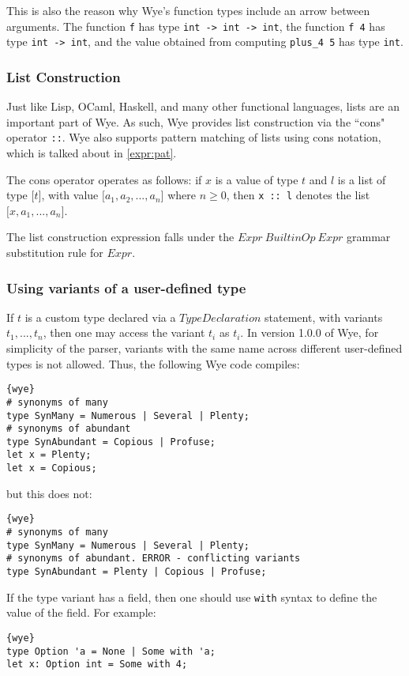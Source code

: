 \documentclass[a4paper, 12pt]{article}
\theoremstyle{myplain}
\theoremstyle{mydefinition}
\theoremstyle{myremark}
\numberwithin{equation} {section}
\numberwithin{figure}   {section}
\numberwithin{table}    {section}
\newcommand{\version}{1.0.0}
\begin{document}
This is also the reason why Wye's function types include an arrow between arguments. The function \texttt{f} has type \texttt{int -> int -> int}, the function \texttt{f 4} has type \texttt{int -> int}, and the value obtained from computing \texttt{plus\_4 5} has type \texttt{int}.

\subsubsection{List Construction}\label{expr:cons}
Just like Lisp, OCaml, Haskell, and many other functional languages, lists are an important part of Wye. As such, Wye provides list construction via the ``cons" operator \texttt{::}. Wye also supports pattern matching of lists using cons notation, which is talked about in \ref{expr:pat}.

The cons operator operates as follows: if $x$ is a value of type $t$ and $l$ is a list of type $\texttt{[}t\texttt{]}$, with value $\texttt{[}a_1, a_2, ..., a_n\texttt{]}$ where $n\geq 0$, then \texttt{x :: l} denotes the list $\texttt{[}x, a_1, ..., a_n\texttt{]}$.

The list construction expression falls under the $Expr\: BuiltinOp\: Expr$ grammar substitution rule for $Expr$.

\subsubsection{Using variants of a user-defined type}
If $t$ is a custom type declared via a $TypeDeclaration$ statement, with variants $t_1, ..., t_n$, then one may access the variant $t_i$ as $t_i$. In version \version{} of Wye, for simplicity of the parser, variants with the same name across different user-defined types is not allowed. Thus, the following Wye code compiles:
\begin{lstlisting}{wye}
# synonyms of many
type SynMany = Numerous | Several | Plenty;
# synonyms of abundant
type SynAbundant = Copious | Profuse;
let x = Plenty;
let x = Copious;
\end{lstlisting}
but this does not:
\begin{lstlisting}{wye}
# synonyms of many
type SynMany = Numerous | Several | Plenty;
# synonyms of abundant. ERROR - conflicting variants
type SynAbundant = Plenty | Copious | Profuse;
\end{lstlisting}

If the type variant has a field, then one should use \texttt{with} syntax to define the value of the field. For example:
\begin{lstlisting}{wye}
type Option 'a = None | Some with 'a;
let x: Option int = Some with 4;
\end{lstlisting}
\end{document}
